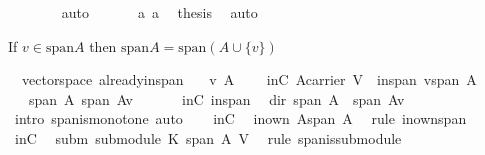 \begin{isabellebody}
\ \ \ \ \ \ \isamarkupfalse%
\ auto\isanewline
\ \ \isamarkupfalse%
\isanewline
\ \ \isamarkupfalse%
\ a{}\ a{}\ \isamarkupfalse%
\ {\isacharquery}thesis\ \isamarkupfalse%
\ auto\isanewline
{}\isamarkupfalse%
%
\endisatagproof
{\isafoldproof}%
%
\isadelimproof
%
\endisadelimproof
%
\begin{isamarkuptext}%
If $v\in \text{span} A$ then $\text{span}A =\text{span}(A\cup \{v\})$%
\end{isamarkuptext}%
\isamarkuptrue%
\isamarkupfalse%
\ {\isacharparenleft}\ vectorspace{\isacharparenright}\ already{\isacharunderscore}in{\isacharunderscore}span{\isacharcolon}\isanewline
\ \ \ v\ A\isanewline
\ \ \ \ inC{\isacharcolon}\ {\isachardoublequoteopen}A{\isasymsubseteq}carrier\ V{\isachardoublequoteclose}\ \ inspan{\isacharcolon}\ {\isachardoublequoteopen}v{\isasymin}span\ A{\isachardoublequoteclose}\isanewline
\ \ \ {\isachardoublequoteopen}span\ A{\isacharequal}\ span\ {\isacharparenleft}A{\isasymunion}{\isacharbraceleft}v{\isacharbraceright}{\isacharparenright}{\isachardoublequoteclose}\isanewline
%
\isadelimproof
%
\endisadelimproof
%
\isatagproof
{}\isamarkupfalse%
\ {\isacharminus}\ \isanewline
\ \ \isamarkupfalse%
\ inC\ inspan\ \isamarkupfalse%
\ dir{}{\isacharcolon}\ {\isachardoublequoteopen}span\ A\ {\isasymsubseteq}\ span\ {\isacharparenleft}A{\isasymunion}{\isacharbraceleft}v{\isacharbraceright}{\isacharparenright}{\isachardoublequoteclose}\ \isamarkupfalse%
\ {\isacharparenleft}intro\ span{\isacharunderscore}is{\isacharunderscore}monotone{\isacharcomma}\ auto{\isacharparenright}\isanewline
\isanewline
\ \ \isamarkupfalse%
\ inC\ \isamarkupfalse%
\ inown{\isacharcolon}\ {\isachardoublequoteopen}A{\isasymsubseteq}span\ A{\isachardoublequoteclose}\ \isamarkupfalse%
\ {\isacharparenleft}rule\ in{\isacharunderscore}own{\isacharunderscore}span{\isacharparenright}\isanewline
\ \ \isamarkupfalse%
\ inC\ \isamarkupfalse%
\ subm{\isacharcolon}\ {\isachardoublequoteopen}submodule\ K\ {\isacharparenleft}span\ A{\isacharparenright}\ V{\isachardoublequoteclose}\ \isamarkupfalse%
\ {\isacharparenleft}rule\ span{\isacharunderscore}is{\isacharunderscore}submodule{\isacharparenright}\isanewline
\ \ \isamarkupfalse%

\end{isabellebody}

